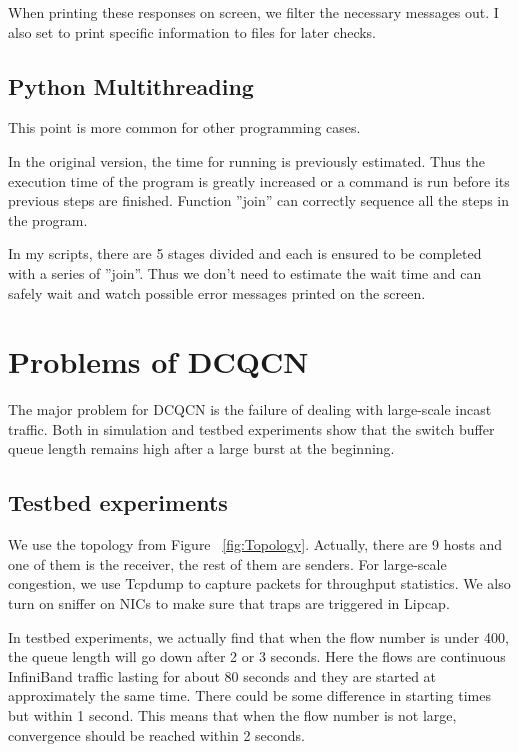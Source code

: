 \documentclass[12pt,a4paper]{article}
\begin{document}
When printing these responses on screen, we filter the necessary messages out.
I also set to print specific information to files for later checks.

\subsection{Python Multithreading}

This point is more common for other programming cases.

In the original version, the time for running is previously estimated.
Thus the execution time of the program is greatly increased or a command is run before its previous steps are finished.
Function ''join'' can correctly sequence all the steps in the program.

In my scripts, there are 5 stages divided and each is ensured to be completed with a series of ''join''.
Thus we don't need to estimate the wait time and can safely wait and watch possible error messages printed on the screen.


\section{Problems of DCQCN}

The major problem for DCQCN is the failure of dealing with large-scale incast traffic.
Both in simulation \cite{NS3} and testbed experiments show that the switch buffer queue length remains high
after a large burst at the beginning.

\subsection{Testbed experiments}

We use the topology from Figure ~\ref{fig:Topology}.
Actually, there are 9 hosts and one of them is the receiver, the rest of them are senders.
For large-scale congestion, we use Tcpdump \cite{Tcpdump} to capture packets for throughput statistics.
We also turn on sniffer on NICs to make sure that traps are triggered in Lipcap.

In testbed experiments, we actually find that when the flow number is under 400, the queue length will go down after 2 or 3 seconds.
Here the flows are continuous InfiniBand traffic lasting for about 80 seconds and they are started at approximately the same time.
There could be some difference in starting times but within 1 second.
This means that when the flow number is not large, convergence should be reached within 2 seconds.
\end{document}
